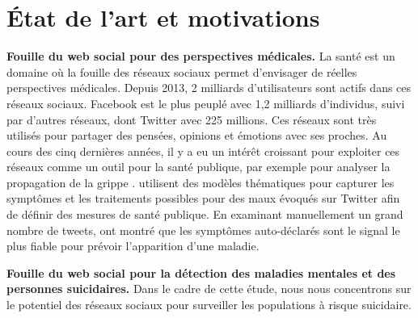
\section{\'Etat de l'art et motivations}\label{TravauxRelatifs}

\textbf{Fouille du web social pour des perspectives médicales.}
La santé est un domaine où la fouille des réseaux sociaux permet d’envisager de réelles perspectives médicales.  Depuis 2013, 2 milliards d'utilisateurs sont actifs dans ces réseaux sociaux. Facebook est le plus peuplé avec 1,2 milliards d’individus, suivi par d'autres réseaux, dont Twitter avec 225 millions. Ces réseaux sont très utilisés pour partager des pensées, opinions et émotions avec ses proches. Au cours des cinq dernières années, il y a eu un intérêt croissant pour exploiter ces réseaux  comme un outil pour la santé publique, par exemple pour analyser la propagation de la grippe \cite{Sadilek12modelingspread}. \cite{ICWSM112880}  utilisent des modèles thématiques pour capturer les symptômes et les traitements possibles pour des maux évoqués sur Twitter afin de définir des mesures de santé publique. En examinant manuellement un grand nombre de tweets, \cite{Krieck11anew} ont montré que les symptômes auto-déclarés sont le signal le plus fiable pour prévoir l'apparition d'une maladie. 

\textbf{Fouille du web social pour la détection des maladies mentales et des personnes suicidaires.}
Dans le cadre de cette étude, nous nous concentrons sur le potentiel des réseaux sociaux pour surveiller les populations à risque suicidaire.

